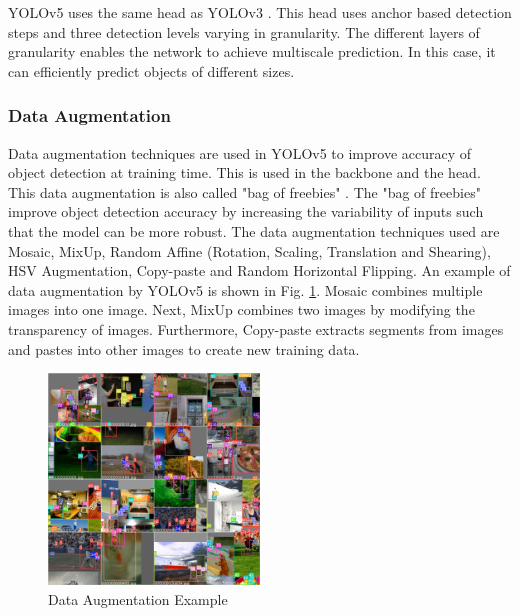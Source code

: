 \documentclass[12pt,a4paper,fleqn]{report}
\begin{document}
YOLOv5 uses the same head as YOLOv3 \cite{yolov3:2018}. 
This head uses anchor based detection steps and three detection levels varying in granularity. 
The different layers of granularity enables the network to achieve multiscale prediction. 
In this case, it can efficiently predict objects of different sizes.


\subsubsection{Data Augmentation}
Data augmentation techniques are used in YOLOv5 to improve accuracy of object
detection at training time. 
This is used in the backbone and the head.
This data augmentation is also called "bag of freebies" \cite{yolov4:2020}. 
The "bag of freebies" improve object detection accuracy by increasing the variability of inputs
such that the model can be more robust. 
The data augmentation techniques used are Mosaic, MixUp, Random Affine (Rotation, Scaling,
Translation and Shearing), HSV Augmentation, Copy-paste and Random Horizontal Flipping. 
An example of data augmentation by YOLOv5 is shown in Fig. \ref{fig:data_augmentation}.
Mosaic combines multiple images into one image.
Next, MixUp combines two images by modifying the transparency of images.
Furthermore, Copy-paste extracts segments from images and pastes into other images to create new
training data.

\begin{figure}[htbp]
    \begin{center}
        \includegraphics[width=0.5\textwidth]{figures/augmentation_ex.jpg}
    \end{center}
    \caption{Data Augmentation Example}
    \label{fig:data_augmentation}
\end{figure}
\end{document}
